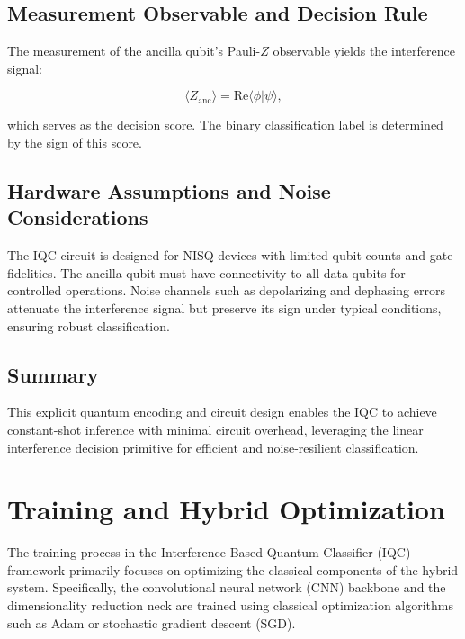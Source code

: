 \documentclass[conference]{IEEEtran}
\begin{document}
\subsection{Measurement Observable and Decision Rule}

The measurement of the ancilla qubit's Pauli-$Z$ observable yields the interference signal:

\begin{equation}
\langle Z_{\text{anc}} \rangle = \mathrm{Re}\langle \phi | \psi \rangle,
\end{equation}

which serves as the decision score. The binary classification label is determined by the sign of this score.

\subsection{Hardware Assumptions and Noise Considerations}

The IQC circuit is designed for NISQ devices with limited qubit counts and gate fidelities. The ancilla qubit must have connectivity to all data qubits for controlled operations. Noise channels such as depolarizing and dephasing errors attenuate the interference signal but preserve its sign under typical conditions, ensuring robust classification.

\subsection{Summary}

This explicit quantum encoding and circuit design enables the IQC to achieve constant-shot inference with minimal circuit overhead, leveraging the linear interference decision primitive for efficient and noise-resilient classification.


\section{Training and Hybrid Optimization}

The training process in the Interference-Based Quantum Classifier (IQC) framework primarily focuses on optimizing the classical components of the hybrid system. Specifically, the convolutional neural network (CNN) backbone and the dimensionality reduction neck are trained using classical optimization algorithms such as Adam or stochastic gradient descent (SGD).
\end{document}
